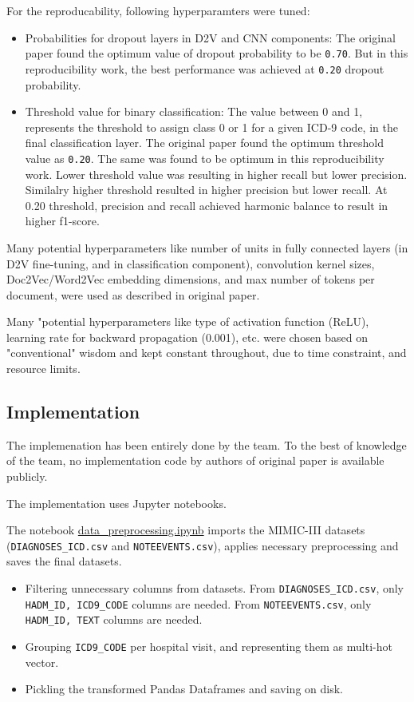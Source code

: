 \documentclass[11pt,a4paper]{article}
\begin{document}
For the reproducability, following hyperparamters were tuned:
\begin{itemize}
	\item Probabilities for dropout layers in D2V and CNN components: The original paper found the optimum value of dropout probability to be \texttt{0.70}. But in this reproducibility work, the best performance was achieved at \texttt{0.20} dropout probability. 
	\item Threshold value for binary classification: The value between 0 and 1, represents the threshold to assign class 0 or 1 for a given ICD-9 code, in the final classification layer. The original paper found the optimum threshold value as \texttt{0.20}. The same was found to be optimum in this reproducibility work. Lower threshold value was resulting in higher recall but lower precision. Similalry higher threshold resulted in higher precision but lower recall. At 0.20 threshold, precision and recall achieved harmonic balance to result in higher f1-score.
\end{itemize}

Many potential hyperparameters like number of units in fully connected layers (in D2V fine-tuning, and in classification component), convolution kernel sizes, Doc2Vec/Word2Vec embedding dimensions, and max number of tokens per document, were used as described in original paper.

Many "potential hyperparameters like type of activation function (ReLU), learning rate for backward propagation (0.001), etc. were chosen based on "conventional" wisdom and kept constant throughout, due to time constraint, and resource limits.

\subsection{Implementation}

The implemenation has been entirely done by the team. To the best of knowledge of the team, no implementation code by authors of original paper is available publicly.

The implementation uses Jupyter notebooks.

The notebook \href{https://github.com/manuv3/cs598-dl-project/blob/main/src/data\_preprocessing.ipynb}{data\_preprocessing.ipynb} imports the MIMIC-III datasets (\texttt{DIAGNOSES\_ICD.csv} and \texttt{NOTEEVENTS.csv}), applies necessary preprocessing and saves the final datasets.
    \begin{itemize}
    		\item Filtering unnecessary columns from datasets. From \texttt{DIAGNOSES\_ICD.csv}, only \texttt{HADM\_ID, ICD9\_CODE} columns are needed. From \texttt{NOTEEVENTS.csv}, only \texttt{HADM\_ID, TEXT} columns are needed.
    		\item Grouping \texttt{ICD9\_CODE} per hospital visit, and representing them as multi-hot vector.
    		\item Pickling the transformed Pandas Dataframes and saving on disk.
    \end{itemize}
\end{document}
